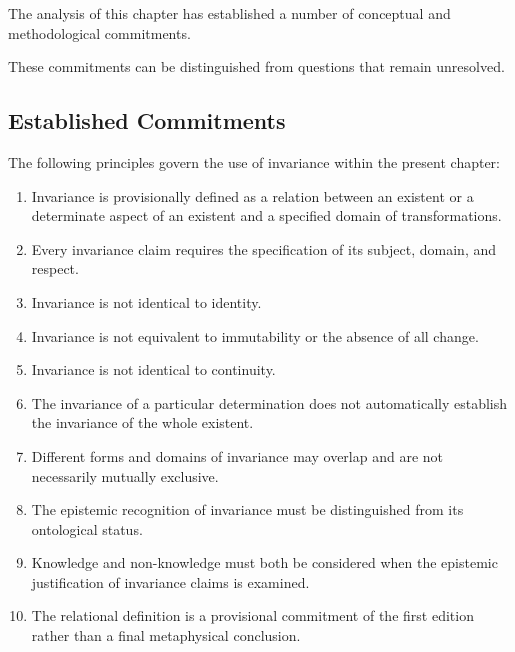 
The analysis of this chapter
has established a number of
conceptual and methodological
commitments.

These commitments can be
distinguished from questions
that remain unresolved.

\subsection*{Established Commitments}

The following principles govern
the use of invariance within
the present chapter:

\begin{enumerate}
    \item Invariance is provisionally
    defined as a relation between
    an existent or a determinate
    aspect of an existent and
    a specified domain of
    transformations.

    \item Every invariance claim
    requires the specification
    of its subject, domain,
    and respect.

    \item Invariance is not
    identical to identity.

    \item Invariance is not
    equivalent to immutability
    or the absence of all change.

    \item Invariance is not
    identical to continuity.

    \item The invariance of
    a particular determination
    does not automatically
    establish the invariance
    of the whole existent.

    \item Different forms and
    domains of invariance may
    overlap and are not
    necessarily mutually
    exclusive.

    \item The epistemic recognition
    of invariance must be
    distinguished from its
    ontological status.

    \item Knowledge and
    non-knowledge must both
    be considered when the
    epistemic justification
    of invariance claims
    is examined.

    \item The relational
    definition is a provisional
    commitment of the first
    edition rather than a
    final metaphysical
    conclusion.
\end{enumerate}

